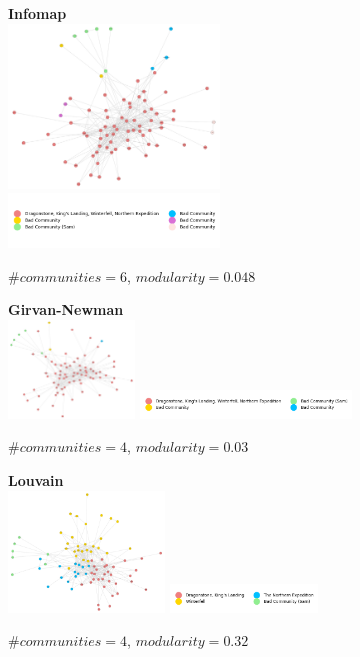 \documentclass[10pt,twocolumn,letterpaper]{article}
\begin{document}
\begin{figure}[!h]
    \centering
    \textbf{Infomap}  \\
    \includegraphics[width=0.5\textwidth]{img/s7/communities_infomap.jpg}
    \includegraphics[width=0.5\textwidth]{img/s7/infomap_legend.jpg}\\
    \caption{\small{$\#communities=6$, $modularity=0.048$}}
    \label{fig:infomap_s7}
    \vspace{2cm}
\end{figure}


\begin{figure}[!h]
    \centering
    \textbf{Girvan-Newman} \\
    \includegraphics[width=0.3\textwidth]{img/s7/communities_g-n.jpg}
    \includegraphics[width=0.5\textwidth]{img/s7/g-n_legend.jpg}\\
    \caption{\small{$\#communities=4$, $modularity=0.03$}}
    \label{fig:gn_s7}
\end{figure}


\begin{figure}[!h]
    \centering
    \textbf{Louvain} \\
    \includegraphics[width=0.37\textwidth]{img/s7/communities_louvain.jpg}
    \includegraphics[width=0.35\textwidth]{img/s7/louvain_legend.jpg}\\
    \caption{\small{$\#communities=4$, $modularity=0.32$}}
    \label{fig:louvain_s7}
\end{figure}
\end{document}
